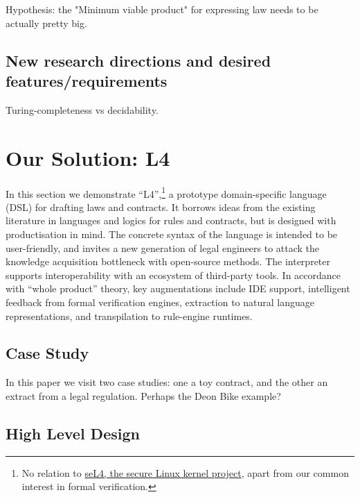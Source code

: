 \documentclass{IOS-Book-Article}
\begin{document}
Hypothesis: the "Minimum viable product" for expressing law needs to be actually pretty big.

\subsection{New research directions and desired features/requirements}

Turing-completeness vs decidability.

\section{Our Solution: L4}

In this section we demonstrate ``L4'',\footnote{No relation to \href{https://dl.acm.org/doi/10.1145/1629575.1629596}{seL4, the secure Linux kernel project}, apart from our common interest in formal verification.} a prototype domain-specific language (DSL) for drafting laws and contracts. It borrows ideas from the existing literature in languages and logics for rules and contracts, but is designed with productisation in mind. The concrete syntax of the language is intended to be user-friendly, and invites a new generation of legal engineers to attack the knowledge acquisition bottleneck with open-source methods. The interpreter supports interoperability with an ecosystem of third-party tools. In accordance with ``whole product'' theory, key augmentations include IDE support, intelligent feedback from formal verification engines, extraction to natural language representations, and transpilation to rule-engine runtimes.

\subsection{Case Study}

In this paper we visit two case studies: one a toy contract, and the other an extract from a legal regulation. Perhaps the Deon Bike example?

\subsection{High Level Design}
\end{document}
